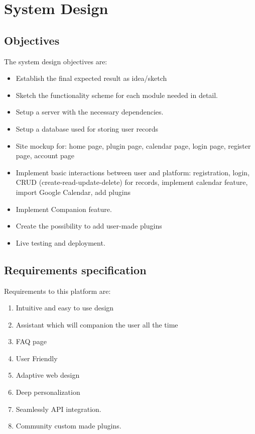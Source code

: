 \section{System Design}
\graphicspath{ {./images/} }

\subsection{Objectives}
\par The system design objectives are:
\begin{itemize}
	\item Establish the final expected result as idea/sketch 
	\item Sketch the functionality scheme for each module needed in detail.
	\item Setup a server with the necessary dependencies.
	\item Setup a database used for storing user records
	\item Site mockup for: home page, plugin page, calendar page, login page, register page, account page
	\item Implement basic interactions between user and platform: registration, login, CRUD (create-read-update-delete) for records, implement calendar feature, import Google Calendar, add plugins
	\item Implement Companion feature.
	\item Create the possibility to add user-made plugins 
	\item Live testing and deployment.
	
\end{itemize}


\subsection{Requirements specification}
\par Requirements to this platform are:  
\begin{enumerate}
	\item Intuitive and easy to use design  
	
	\item Assistant which will companion the user all the time  
	
	\item FAQ page  
	
	\item User Friendly 
	
	\item Adaptive web design 
	
	\item Deep personalization 
	
	\item Seamlessly API integration. 
	
	\item Community custom made plugins. 
\end{enumerate}


